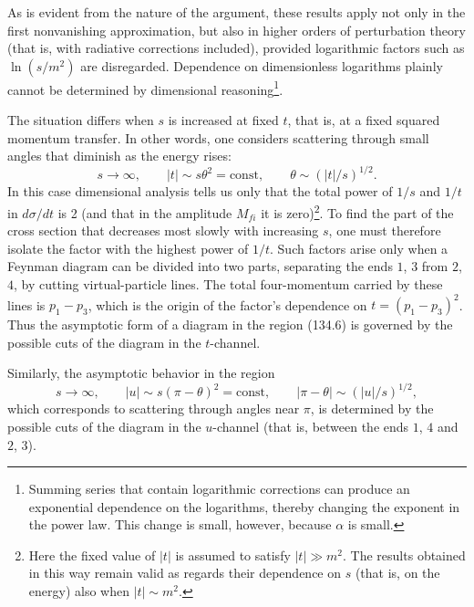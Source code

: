 As is evident from the nature of the argument, these results apply not only in the first nonvanishing approximation, but also in higher orders of perturbation theory (that is, with radiative corrections included), provided logarithmic factors such as $\ln(s/m^2)$ are disregarded. Dependence on dimensionless logarithms plainly cannot be determined by dimensional reasoning\footnote{Summing series that contain logarithmic corrections can produce an exponential dependence on the logarithms, thereby changing the exponent in the power law. This change is small, however, because $\alpha$ is small.}.

The situation differs when $s$ is increased at fixed $t$, that is, at a fixed squared momentum transfer. In other words, one considers scattering through small angles that diminish as the energy rises:
\begin{equation}
s\to\infty,\qquad |t|\sim s\theta^2=\mathrm{const},\qquad
\theta\sim(|t|/s)^{1/2}.
\tag{134.6}
\end{equation}
In this case dimensional analysis tells us only that the total power of $1/s$ and $1/t$ in $d\sigma/dt$ is 2 (and that in the amplitude $M_{fi}$ it is zero)\footnote{Here the fixed value of $|t|$ is assumed to satisfy $|t|\gg m^2$. The results obtained in this way remain valid as regards their dependence on $s$ (that is, on the energy) also when $|t|\sim m^2$.}. To find the part of the cross section that decreases most slowly with increasing $s$, one must therefore isolate the factor with the highest power of $1/t$. Such factors arise only when a Feynman diagram can be divided into two parts, separating the ends $1$, $3$ from $2$, $4$, by cutting virtual-particle lines. The total four-momentum carried by these lines is $p_1-p_3$, which is the origin of the factor's dependence on $t=(p_1-p_3)^2$. Thus the asymptotic form of a diagram in the region (134.6) is governed by the possible cuts of the diagram in the $t$-channel.

Similarly, the asymptotic behavior in the region
\begin{equation}
s\to\infty,\qquad |u|\sim s(\pi-\theta)^2=\mathrm{const},\qquad
|\pi-\theta|\sim(|u|/s)^{1/2},
\tag{134.7}
\end{equation}
which corresponds to scattering through angles near $\pi$, is determined by the possible cuts of the diagram in the $u$-channel (that is, between the ends $1$, $4$ and $2$, $3$).

